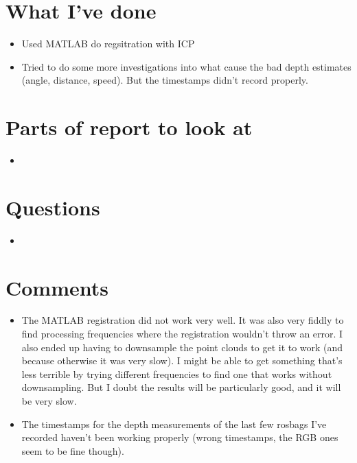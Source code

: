 \documentclass[12pt,a4paper]{article}
\begin{document}
\author{Katrina Ashton}


\pagestyle{fancy}
\fancyhf{}
\rhead{\thepage}

\section{What I've done}
\begin{itemize}
  \item Used MATLAB do regsitration with ICP
  \item Tried to do some more investigations into what cause the bad depth estimates (angle, distance, speed). But the timestamps didn't record properly.
\end{itemize}

\section{Parts of report to look at}
\begin{itemize}
\item 
\end{itemize}

\section{Questions}
\begin{itemize}
\item 
\end{itemize}

\section{Comments}
\begin{itemize}
  \item The MATLAB registration did not work very well. It was also very fiddly to find processing frequencies where the registration wouldn't throw an error. I also ended up having to downsample the point clouds to get it to work (and because otherwise it was very slow). I might be able to get something that's less terrible by trying different frequencies to find one that works without downsampling. But I doubt the results will be particularly good, and it will be very slow.
  \item The timestamps for the depth measurements of the last few rosbags I've recorded haven't been working properly (wrong timestamps, the RGB ones seem to be fine though).
\end{itemize}
\end{document}
